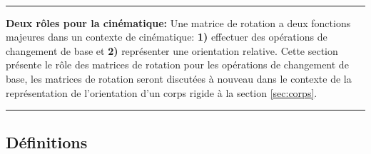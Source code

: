 \\ \noindent
\rule{\linewidth}{0.3mm}
\textbf{Deux rôles pour la cinématique:} Une matrice de rotation a deux fonctions majeures dans un contexte de cinématique: \textbf{1)} effectuer des opérations de changement de base et \textbf{2)} représenter une orientation relative. Cette section présente le rôle des matrices de rotation pour les opérations de changement de base, les matrices de rotation seront discutées à nouveau dans le contexte de la représentation de l'orientation d'un corps rigide à la section \ref{sec:corps}.
\\
\rule{\linewidth}{0.3mm}

\subsection{Définitions}


